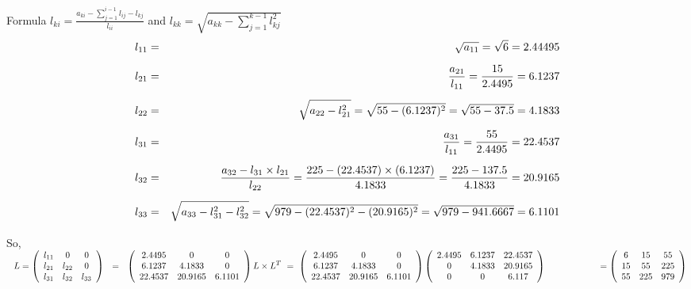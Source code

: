 \documentclass[12pt]{report}
\newcommand{\sps}{\\[0.2cm]}
\newcommand{\spn}[1]{\\[#1cm]}
\newcommand{\NI}{\noindent}
\newcommand{\dsp}{\displaystyle}
\begin{document}
	\NI Formula $\dsp l_{ki} = \frac{a_{ki} - \sum\limits_{j=1}^{i-1} l_{ij} - l_{kj}}{l_{ii}} $ and $\dsp l_{kk} = \sqrt{a_{kk} - \sum\limits_{j=1}^{k-1}l_{kj}^2}$
	\begin{eqnarray}
		l_{11} &=& \sqrt{a_{11}} = \sqrt{6} = 2.44495 \notag\sps
		l_{21} &=& \frac{a_{21}}{l_{11}} = \frac{15}{2.4495} = 6.1237 \notag \sps
		l_{22} &=& \sqrt{a_{22} - l_{21}^2} = \sqrt{55 - (6.1237)^2} = \sqrt{55-37.5} = 4.1833 \notag \sps
		l_{31} &=& \frac{a_{31}}{l_{11}} = \frac{55}{2.4495} = 22.4537 \notag \sps
		l_{32} &=& \frac{a_{32} - l_{31} \times l_{21}}{l_{22}} = \frac{225 - (22.4537) \times (6.1237)}{4.1833} = \frac{225-137.5}{4.1833} = 20.9165 \notag \sps
		l_{33} &=& \sqrt{a_{33} - l_{31}^2 - l_{32}^2} = \sqrt{979 - (22.4537)^2 - (20.9165)^2} = \sqrt{979 - 941.6667} = 6.1101 \notag \sps
	\end{eqnarray}
	So, 
	$\dsp
		~~L = 
			\left(
				\begin{array}{ccc}
					l_{11} & 0 & 0 \\
					l_{21} & l_{22} & 0 \\
					l_{31} & l_{32} & l_{33}\\
				\end{array}
			\right) ~~ = ~~
			\left(
				\begin{array}{ccc}
					2.4495 & 0 & 0 \\
					6.1237 & 4.1833 & 0\\
					22.4537 & 20.9165 & 6.1101\\
				\end{array}
			\right)
			\spn{0.9}
		L\times L^T ~=~ 
		\left( 
			\begin{array}{ccc}
				2.4495 & 0 & 0 \\
				6.1237 & 4.1833 & 0\\
				22.4537 & 20.9165 & 6.1101\\
			\end{array}
		\right)
		\left(
			\begin{array}{ccc}
				2.4495 & 6.1237 & 22.4537\\
				0 & 4.1833 & 20.9165 \\
				0 & 0 & 6.117\\
			\end{array}
		\right)
		\spn{0.9}
		~~~~~~~~~~~~~~~~~~= 
		\left(
			\begin{array}{cccc}
				6 & 15 & 55\\
				15 & 55 & 225\\
				55 & 225 & 979\\
			\end{array}
		\right)
	$\sps
	
\end{document}
